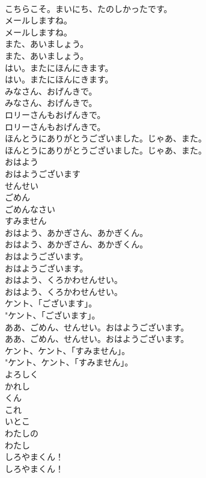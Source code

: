 \documentclass[8pt]{extreport}
\begin{document}
\begin{CJK}{UTF8}{min}
\\	こちらこそ。まいにち、たのしかったです。 
\\	メールしますね。	
\\	メールしますね。 
\\	また、あいましょう。	
\\	また、あいましょう。 
\\	はい。またにほんにきます。	
\\	はい。またにほんにきます。 
\\	みなさん、おげんきで。	
\\	みなさん、おげんきで。 
\\	ロリーさんもおげんきで。	
\\	ロリーさんもおげんきで。 
\\	ほんとうにありがとうございました。じゃあ、また。	
\\	ほんとうにありがとうございました。じゃあ、また。 
\\	おはよう
\\	おはようございます
\\	せんせい
\\	ごめん
\\	ごめんなさい
\\	すみません
\\	おはよう、あかぎさん、あかぎくん。	
\\	おはよう、あかぎさん、あかぎくん。 
\\	おはようございます。	
\\	おはようございます。 
\\	おはよう、くろかわせんせい。	
\\	おはよう、くろかわせんせい。 
\\	ケント、「ございます」。	
\\	"ケント、「ございます」。 
\\	ああ、ごめん、せんせい。おはようございます。	
\\	ああ、ごめん、せんせい。おはようございます。 
\\	ケント、ケント、「すみません」。	
\\	"ケント、ケント、「すみません」。 
\\	よろしく
\\	かれし
\\	くん
\\	これ
\\	いとこ
\\	わたしの
\\	わたし
\\	しろやまくん！	
\\	しろやまくん！ 

\end{CJK}
\end{document}
